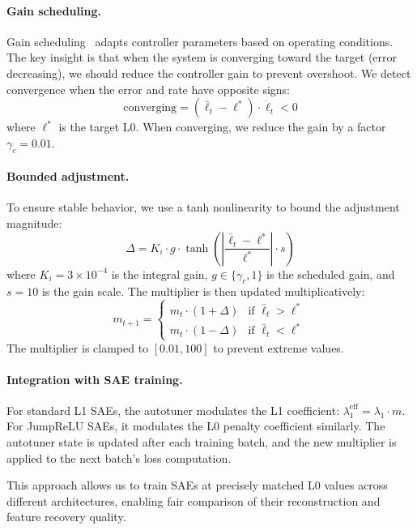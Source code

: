 \documentclass{article}
\theoremstyle{plain}
\theoremstyle{definition}
\theoremstyle{remark}
\begin{document}
\paragraph{Gain scheduling.} Gain scheduling~\citep{rugh2000research} adapts controller parameters based on operating conditions. The key insight is that when the system is converging toward the target (error decreasing), we should reduce the controller gain to prevent overshoot. We detect convergence when the error and rate have opposite signs:
\begin{equation}
    \text{converging} = (\bar{\ell}_t - \ell^*) \cdot \dot{\ell}_t < 0
\end{equation}
where $\ell^*$ is the target L0. When converging, we reduce the gain by a factor $\gamma_c = 0.01$.

\paragraph{Bounded adjustment.} To ensure stable behavior, we use a tanh nonlinearity to bound the adjustment magnitude:
\begin{equation}
    \Delta = K_i \cdot g \cdot \tanh\left(\left|\frac{\bar{\ell}_t - \ell^*}{\ell^*}\right| \cdot s\right)
\end{equation}
where $K_i = 3 \times 10^{-4}$ is the integral gain, $g \in \{\gamma_c, 1\}$ is the scheduled gain, and $s = 10$ is the gain scale. The multiplier is then updated multiplicatively:
\begin{equation}
    m_{t+1} = \begin{cases}
        m_t \cdot (1 + \Delta) & \text{if } \bar{\ell}_t > \ell^* \\
        m_t \cdot (1 - \Delta) & \text{if } \bar{\ell}_t < \ell^*
    \end{cases}
\end{equation}
The multiplier is clamped to $[0.01, 100]$ to prevent extreme values.

\paragraph{Integration with SAE training.} For standard L1 SAEs, the autotuner modulates the L1 coefficient: $\lambda_1^{\text{eff}} = \lambda_1 \cdot m$. For JumpReLU SAEs, it modulates the L0 penalty coefficient similarly. The autotuner state is updated after each training batch, and the new multiplier is applied to the next batch's loss computation.

This approach allows us to train SAEs at precisely matched L0 values across different architectures, enabling fair comparison of their reconstruction and feature recovery quality.
\end{document}
